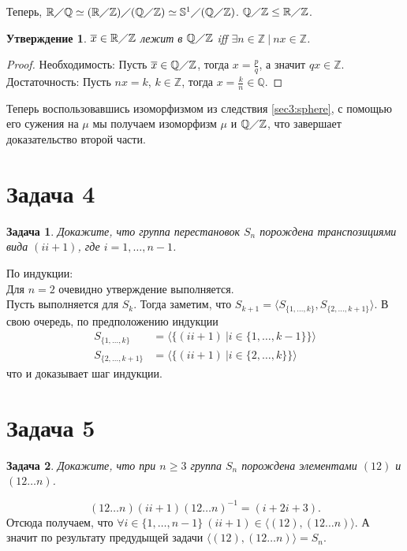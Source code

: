 \documentclass{article}
\newtheorem{task}{Задача}
\newtheorem{statement}{Утверждение}
\newcommand{\gen}[1]{\langle #1 \rangle}
\newcommand{\srange}[2]{\{#1, \dots, #2\}}
\newcommand{\range}[2]{#1, \dots, #2}
\newcommand{\ad}[2]{#1#2#1^{-1}}
\newcommand{\subgroup}{\leq}
\newcommand{\isomorphic}{\simeq}
\newcommand{\sphere}[1]{\mathbb{S}^{#1}}
\newcommand{\quotient}[2]{#1 \diagup #2}
\newcommand{\R}{\mathbb{R}}
\newcommand{\Q}{\mathbb{Q}}
\newcommand{\Z}{\mathbb{Z}}
\newcommand{\class}[1]{\overline{#1}}
\begin{document}
Теперь, 
\begin{math}
    \quotient{\R}{\Q} \isomorphic
    \quotient{(\quotient{\R}{\Z})}{(\quotient{\Q}{\Z})} \isomorphic
    \quotient{\sphere{1}}{(\quotient{\Q}{\Z})}
\end{math}.
$\quotient{\Q}{\Z} \subgroup \quotient{\R}{\Z}$.

\begin{statement}
$\class{x} \in \quotient{\R}{\Z}$ лежит в $\quotient{\Q}{\Z}$ iff $\exists n \in \Z ~ | ~ n x \in \Z$. 
\end{statement}

\begin{proof}
    Необходимость: 
    Пусть $\class{x} \in \quotient{\Q}{\Z}$, тогда $x = \frac{p}{q}$, а значит $q x \in \Z$.
    Достаточность:
    Пусть $n x = k$, $k \in \Z$, тогда $x = \frac{k}{n} \in \Q$.
\end{proof}

Теперь воспользовавшись изоморфизмом из следствия \ref{sec3:sphere}, 
с помощью его сужения на $\mu$ мы получаем изоморфизм $\mu$ и $\quotient{\Q}{\Z}$, что завершает доказательство второй части.

\section*{Задача 4}

\begin{task}
Докажите, что группа перестановок $S_n$ порождена транспозициями вида $(i i + 1)$, где $i = \range{1}{n - 1}$.
\end{task}

По индукции: \\ 

Для $n = 2$ очевидно утверждение выполняется.\\

Пусть выполняется для $S_k$. 
Тогда заметим, что $S_{k + 1} = \gen{S_{\srange{1}{k}}, S_{\srange{2}{k + 1}}}$.
В свою очередь, по предположению индукции 
\begin{align*}
    S_{\srange{1}{k}} &= \gen{\{(i i + 1) ~ | i \in \srange{1}{k - 1}\}} \\
    S_{\srange{2}{k + 1}} &= \gen{\{(i i + 1) ~ | i \in \srange{2}{k}\}}
\end{align*}
что и доказывает шаг индукции.


\section*{Задача 5}

\begin{task}
Докажите, что при $n \geq 3$ группа $S_n$ порождена элементами $(12)$ и $(12 \dots n)$.
\end{task}

\begin{equation*}
    \ad{(12 \dots n)}{(ii+1)} = (i+2 i+3).
\end{equation*}
Отсюда получаем, что $\forall i \in \srange{1}{n - 1} ~ (i i+1) \in \gen{(12), (12 \dots n)}$.
А значит по результату предудыщей задачи $\gen{(12), (12 \dots n)} = S_n$.
\end{document}
